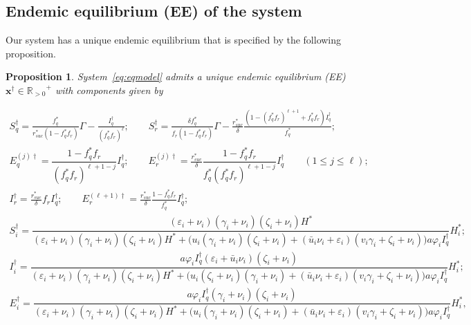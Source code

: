 \documentclass[a4paper]{article}
\newcommand{\varpiVar}{r_{suc}}
\newtheorem{prop}{Proposition}[section]
\begin{document}
\subsection{ Endemic equilibrium (EE) of the system} 
Our system has a unique endemic equilibrium that is  specified by the following proposition.
\begin{prop}\label{prop:stdst1}
System~\eqref{eq:eqmodel} admits a unique endemic equilibrium (EE) $\mathbf x^\dagger \in{\mathbb R_{>0}}^+$ with components given by

\begin{equation}\label{eq:eqexpMinfctstateb}
\begin{array}{l}
S_q^\dagger =\frac{f^*_q}{\varpiVar ^*(1-f^*_qf_r)}\Gamma - \frac{I_q^\dagger }{(f^*_qf_r)^\ell};\qquad S_r^\dagger =\frac{\delta f^*_q}{f_r(1-f^*_qf_r)}\Gamma - \frac{\varpiVar ^*}{\delta}\frac{(1-(f^*_qf_r)^{\ell+1}+f^*_qf_r)I_q^\dagger }{ f^*_q}; \\ 
E_q^{(j)\dagger }=\dfrac{1-f^*_qf_r }{(f^*_qf_r)^{\ell+1-j}}I_q^\dagger ; 
\qquad E_r^{(j)\dagger }=\frac{\varpiVar ^* }{\delta }\dfrac{1-f^*_qf_r}{ f^*_q(f^*_qf_r)^{\ell+1-j}} I_q^\dagger \qquad(1\leqslant j\leqslant \ell);
\\
I_r^\dagger =\frac{\varpiVar ^* }{\delta }f_rI_q^\dagger ; \qquad E_r^{(\ell+1)\dagger }=\frac{\varpiVar ^* }{\delta }\frac{1-f^*_qf_r}{f^*_q} I_q^\dagger ;\\
S_i^\dagger = \dfrac{(\varepsilon_i+\nu_i) (\gamma_i+\nu_i)(\zeta_i+\nu_i)H^*}{ (\varepsilon_i+\nu_i)(\gamma_i+\nu_i)(\zeta_i+\nu_i)H^* + \Big(u_i(\gamma_i+\nu_i)(\zeta_i+\nu_i) + (\bar u_i\nu_i+\varepsilon_i)(v_i\gamma_i + \zeta_i+\nu_i) \Big)a\varphi_i I^\dagger_q}H^*_i;\\I_i^\dagger  = \dfrac{a\varphi_i I^\dagger_q(\varepsilon_i + \bar u_i\nu_i)(\zeta_i+\nu_i)}{ (\varepsilon_i+\nu_i)(\gamma_i+\nu_i)(\zeta_i+\nu_i)H^* + \Big(u_i(\zeta_i+\nu_i)(\gamma_i+\nu_i) + (\bar u_i\nu_i+\varepsilon_i)(v_i\gamma_i + \zeta_i+\nu_i)\Big)a\varphi_i I^\dagger_q}H^*_i;\\ E^\dagger _i =  \dfrac{a\varphi_i I^\dagger_q(\gamma_i+\nu_i)(\zeta_i+\nu_i)}{ (\varepsilon_i+\nu_i)(\gamma_i+\nu_i)(\zeta_i+\nu_i)H^* + \Big(u_i(\gamma_i+\nu_i)(\zeta_i+\nu_i) + (\bar u_i\nu_i+\varepsilon_i)(v_i\gamma_i + \zeta_i+\nu_i)\Big)a\varphi_i I^\dagger_q}H^*_i,
\end{array}
\end{equation}


\end{prop}
\end{document}
